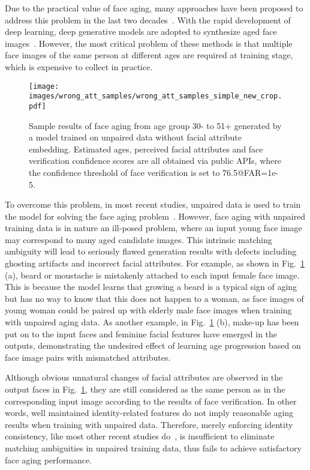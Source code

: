 \documentclass[letterpaper]{article} %
\begin{document}
Due to the practical value of face aging, many approaches have been proposed to address this problem in the last two decades~\cite{lanitis2002toward,tazoe2012facial,suo2010compositional,tiddeman2001prototyping,kemelmacher2014illumination}.
With the rapid development of deep learning, deep generative models are adopted to synthesize aged face images~\cite{wang2016recurrent,duong2016longitudinal,duong2017temporal}. 
However, the most critical problem of these methods is that multiple face images of the same person at different ages are required at training stage, which is expensive to collect in practice.

\begin{figure}[t]
\centering\texttt{[image: images/wrong\_att\_samples/wrong\_att\_samples\_simple\_new\_crop.pdf]}
\caption{Sample results of face aging from age group 30- to 51+ generated by a model trained on unpaired data without facial attribute embedding. 
Estimated ages, perceived facial attributes and face verification confidence scores are all obtained via public APIs, where the confidence threshold of face verification is set to 76.5@FAR=1e-5.}
\label{fig:faceAttIdt}
\end{figure}

To overcome this problem, in most recent studies, unpaired data is used to train the model for solving the face aging problem~\cite{zhang2017age,yang2017learning,li2018global}.
However, face aging with unpaired training data is in nature an ill-posed problem, where an input young face image may correspond to many aged candidate images. This intrinsic matching ambiguity will lead to seriously flawed generation results with defects including ghosting artifacts and incorrect facial attributes. 
For example, as shown in Fig.~\ref{fig:faceAttIdt} (a), beard or moustache is mistakenly attached to each input female face image. 
This is because the model learns that growing a beard is a typical sign of aging but has no way to know that this does not happen to a woman, as face images of young woman could be paired up with elderly male face images when training with unpaired aging data. 
As another example, in Fig.~\ref{fig:faceAttIdt} (b), make-up has been put on to the input faces and feminine facial features have emerged in the outputs, demonstrating the undesired effect of learning age progression based on face image pairs with mismatched attributes.

Although obvious unnatural changes of facial attributes are observed in the output faces in Fig.~\ref{fig:faceAttIdt}, they are still considered as the same person as in the corresponding input image according to the results of face verification. 
In other words, well maintained identity-related features do not imply reasonable aging results when training with unpaired data.
Therefore, merely enforcing identity consistency, like most other recent studies do~\cite{zhang2017age,antipov2017face,yang2017learning}, is insufficient to eliminate matching ambiguities in unpaired training data, thus fails to achieve satisfactory face aging performance.
\end{document}
